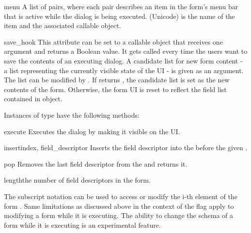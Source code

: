 \begin{memberdesc}[Form]{menu}
A list of  pairs, where 
each pair describes an item in the form's menu bar that is active while the 
dialog is being executed.  (Unicode) is the name of 
the item and  the associated callable object.
\end{memberdesc}

\begin{memberdesc}[Form]{save_hook}
This attribute can be set to a callable object that receives one argument 
and returns a Boolean value. It gets called every time the users want to 
save the contents of an executing  dialog. A candidate list for 
new form content - a list representing the currently visible state of the 
UI - is given as an argument. The list can be modified by 
. If  returns , the 
candidate list is set as the new contents of the form. Otherwise, the form 
UI is reset to reflect the field list contained in  object.
\end{memberdesc}

Instances of  type have the following methods:

\begin{methoddesc}[Form]{execute}{}
Executes the dialog by making it visible on the UI.
\end{methoddesc}

\begin{methoddesc}[Form]{insert}{index, field_descriptor}
Inserts the field descriptor into the  before the given .
\end{methoddesc}

\begin{methoddesc}[Form]{pop}{}
Removes the last field descriptor from the  and returns it.
\end{methoddesc}

\begin{methoddesc}[Form]{length}{}the number of field descriptors in the form.
\end{methoddesc}

The subscript notation  can be used to access or modify the
i-th element of the form . Same limitations as discussed above
in the context of the flag  apply to
modifying a form while it is executing. The ability to change the
schema of a form while it is executing is an experimental feature.

